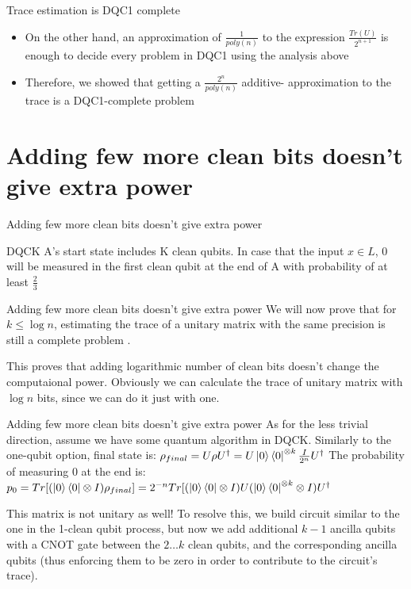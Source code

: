 \documentclass[leqno,fleqn]{beamer}
\begin{document}
\begin{frame}[label=sec-2-7]{Trace estimation is DQC1 complete}
\begin{itemize}
\item On the other hand, an approximation of \(\frac{1}{poly(n)}\) to the
expression \(\frac{Tr(U)}{2^{n+1}}\) is enough to decide every problem
in DQC1 using the analysis above
\item Therefore, we showed that getting a \(\frac{2^{n}}{poly(n)}\) additive-
approximation to the trace is a DQC1-complete problem
\end{itemize}
\end{frame}
\section{Adding few more clean bits doesn't give extra power}
\label{sec-3}
\begin{frame}[label=sec-3-1]{Adding few more clean bits doesn't give extra power}
\begin{block}{DQCK}
A's start state includes K clean qubits. In case that the input \(x \in L\), 0 will be measured in the first clean qubit at the end of A with probability of at least \(\frac{2}{3}\)
\end{block}
\end{frame}
\begin{frame}[label=sec-3-2]{Adding few more clean bits doesn't give extra power}
We will now prove that for \(k \leq \log{n}\), estimating the trace of a unitary matrix with the same precision is still a complete problem \cite{shor2008estimating}.

This proves that adding logarithmic number of clean bits doesn't change the computaional power.
Obviously we can calculate the trace of unitary matrix with \(\log{n}\) bits, since we can do it just with one. 
\end{frame}
\begin{frame}[label=sec-3-3]{Adding few more clean bits doesn't give extra power}
As for the less trivial direction, assume we have some quantum algorithm in DQCK.
Similarly to the one-qubit option, final state is:
\(\rho_{final} = U \rho U^\dagger = U\left\vert{0}\right\rangle\left\langle{0}\right\vert^{\otimes k}\frac{I}{2^n}U^\dagger\)
The probability of measuring 0 at the end is:
\(p_{0} = Tr[(\left\vert{0}\right\rangle\left\langle{0}\right\vert \otimes I)\rho_{final}] = 2^{-n}Tr[(\left\vert{0}\right\rangle\left\langle{0}\right\vert\otimes I)U(\left\vert{0}\right\rangle\left\langle{0}\right\vert^{\otimes k }\otimes I)U^\dagger\)

This matrix is not unitary as well!
To resolve this, we build circuit similar to the one in the 1-clean qubit process,
but now we add additional \(k-1\) ancilla qubits with a CNOT gate between the \(2 \dots k\) clean qubits, and the corresponding ancilla qubits (thus enforcing them to be zero in order to contribute to the circuit's trace).
\end{frame}
\end{document}

